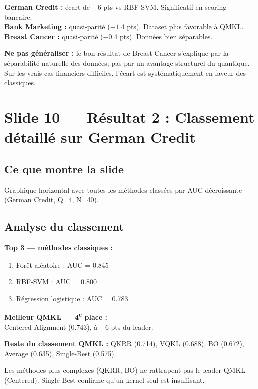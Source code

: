 \documentclass[12pt, a4paper]{article}
\begin{document}
\textbf{German Credit :} écart de $-6$ pts vs RBF-SVM. Significatif en scoring bancaire.\\
\textbf{Bank Marketing :} quasi-parité ($-1.4$ pts). Dataset plus favorable à QMKL.\\
\textbf{Breast Cancer :} quasi-parité ($-0.4$ pts). Données bien séparables.

\begin{attention}
\textbf{Ne pas généraliser :} le bon résultat de Breast Cancer s'explique par la séparabilité naturelle
des données, pas par un avantage structurel du quantique. Sur les vrais cas financiers difficiles,
l'écart est systématiquement en faveur des classiques.
\end{attention}

\section{Slide 10 — Résultat 2 : Classement détaillé sur German Credit}

\subsection*{Ce que montre la slide}

Graphique horizontal avec toutes les méthodes classées par AUC décroissante
(German Credit, Q=4, N=40).

\subsection*{Analyse du classement}

\textbf{Top 3 — méthodes classiques :}
\begin{enumerate}
  \item Forêt aléatoire : AUC = 0.845
  \item RBF-SVM : AUC = 0.800
  \item Régression logistique : AUC = 0.783
\end{enumerate}

\textbf{Meilleur QMKL — 4\textsuperscript{e} place :}\\
Centered Alignment (0.743), à $-6$ pts du leader.

\textbf{Reste du classement QMKL :}
QKRR (0.714), VQKL (0.688), BO (0.672), Average (0.635), Single-Best (0.575).

Les méthodes plus complexes (QKRR, BO) ne rattrapent pas le leader QMKL (Centered).
Single-Best confirme qu'un kernel seul est insuffisant.
\end{document}
